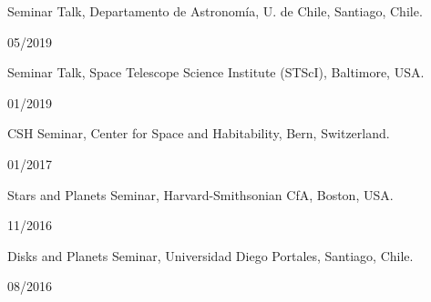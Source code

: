 \documentclass[12pt, a4paper]{article} %
\begin{document}
\begin{minipage}[t]{0.7\textwidth}
\begin{flushleft}%
  \setlength{\leftskip}{0.2cm}%
Seminar Talk, Departamento de Astronom\'ia, U. de Chile, Santiago, Chile.
\end{flushleft}
\end{minipage}
\begin{minipage}[t]{0.3\textwidth}
\hfill 05/2019
\end{minipage}
\vspace{0.2cm}

\begin{minipage}[t]{0.7\textwidth}
\begin{flushleft}%
  \setlength{\leftskip}{0.2cm}%
Seminar Talk, Space Telescope Science Institute (STScI), Baltimore, USA.
\end{flushleft}
\end{minipage}
\begin{minipage}[t]{0.3\textwidth}
\hfill 01/2019
\end{minipage}
\vspace{0.2cm}

\begin{minipage}[t]{0.7\textwidth}
\begin{flushleft}%
  \setlength{\leftskip}{0.2cm}%
CSH Seminar, Center for Space and Habitability, Bern, Switzerland.
\end{flushleft}
\end{minipage}
\begin{minipage}[t]{0.3\textwidth}
\hfill 01/2017
\end{minipage}
\vspace{0.2cm}

\begin{minipage}[t]{0.7\textwidth}
\begin{flushleft}%
  \setlength{\leftskip}{0.2cm}%
Stars and Planets Seminar, Harvard-Smithsonian CfA, Boston, USA.
\end{flushleft}
\end{minipage}
\begin{minipage}[t]{0.3\textwidth}
\hfill 11/2016
\end{minipage}
\vspace{0.2cm}

\begin{minipage}[t]{0.7\textwidth}
\begin{flushleft}%
  \setlength{\leftskip}{0.2cm}%
Disks and Planets Seminar, Universidad Diego Portales, Santiago, Chile.
\end{flushleft}
\end{minipage}
\begin{minipage}[t]{0.3\textwidth}
\hfill 08/2016
\end{minipage}
\vspace{0.2cm}
\end{document}
